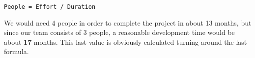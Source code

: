 \vspace{1em}

\begin{lstlisting}[stepnumber=0, frame=single,mathescape]
	People = Effort / Duration
\end{lstlisting}

\vspace{1em}

We would need 4 people in order to complete the project in about 13 months, but since our team consists of 3 people, a reasonable development time would
be about \textbf{17} months. This last value is obviously calculated turning around the last formula.